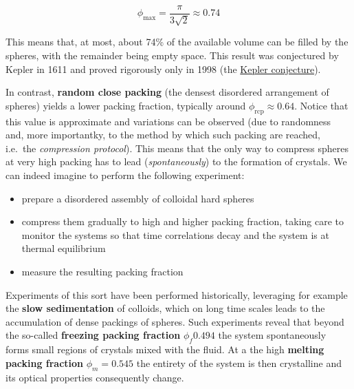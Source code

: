 \documentclass[
  letterpaper,
  enabledeprecatedfontcommands]{report}
\providecommand{\tightlist}{%
  \setlength{\itemsep}{0pt}\setlength{\parskip}{0pt}}
\begin{document}
\[
\phi_{\text{max}} = \frac{\pi}{3\sqrt{2}} \approx 0.74
\]

This means that, at most, about 74\% of the available volume can be
filled by the spheres, with the remainder being empty space. This result
was conjectured by Kepler in 1611 and proved rigorously only in 1998
(the \href{https://en.wikipedia.org/wiki/Kepler_conjecture}{Kepler
conjecture}).

In contrast, \textbf{random close packing} (the densest disordered
arrangement of spheres) yields a lower packing fraction, typically
around \(\phi_{\text{rcp}} \approx 0.64\). Notice that this value is
approximate and variations can be observed (due to randomness and, more
importantky, to the method by which such packing are reached, i.e.~the
\emph{compression protocol}). This means that the only way to compress
spheres at very high packing has to lead (\emph{spontaneously}) to the
formation of crystals. We can indeed imagine to perform the following
experiment:

\begin{itemize}
\tightlist
\item
  prepare a disordered assembly of colloidal hard spheres
\item
  compress them gradually to high and higher packing fraction, taking
  care to monitor the systems so that time correlations decay and the
  system is at thermal equilibrium
\item
  measure the resulting packing fraction
\end{itemize}

Experiments of this sort have been performed historically, leveraging
for example the \textbf{slow sedimentation} of colloids, which on long
time scales leads to the accumulation of dense packings of spheres. Such
experiments reveal that beyond the so-called \textbf{freezing packing
fraction} \(\phi_{f} 0.494\) the system spontaneously forms small
regions of crystals mixed with the fluid. At a the high \textbf{melting
packing fraction} \(\phi_{m}=0.545\) the entirety of the system is then
crystalline and its optical properties consequently change.
\end{document}
